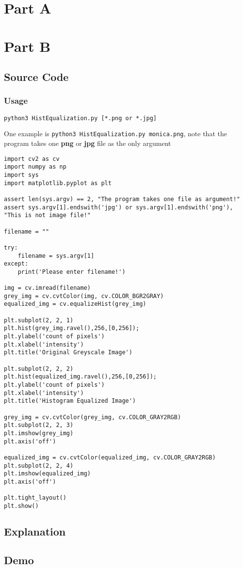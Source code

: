 \documentclass[12pt]{article}
\title{\mytitle}
\author{\myauthor}
\date{}
\begin{document}
\onehalfspacing
\maketitle

\section{Part A}

\newpage
\section{Part B}
\subsection{Source Code}
\subsubsection{Usage}
\begin{Verbatim}[linenos]
python3 HistEqualization.py [*.png or *.jpg]
\end{Verbatim}

One example is \texttt{python3 HistEqualization.py monica.png}, note that the program takes one \textbf{png} or \textbf{jpg} file as the only argument
\begin{verbatim}
import cv2 as cv
import numpy as np
import sys
import matplotlib.pyplot as plt

assert len(sys.argv) == 2, "The program takes one file as argument!"
assert sys.argv[1].endswith('jpg') or sys.argv[1].endswith('png'), "This is not image file!"

filename = ""

try:
    filename = sys.argv[1]
except:
    print('Please enter filename!')

img = cv.imread(filename)
grey_img = cv.cvtColor(img, cv.COLOR_BGR2GRAY)
equalized_img = cv.equalizeHist(grey_img)

plt.subplot(2, 2, 1)
plt.hist(grey_img.ravel(),256,[0,256]);
plt.ylabel('count of pixels')
plt.xlabel('intensity')
plt.title('Original Greyscale Image')

plt.subplot(2, 2, 2)
plt.hist(equalized_img.ravel(),256,[0,256]);
plt.ylabel('count of pixels')
plt.xlabel('intensity')
plt.title('Histogram Equalized Image')

grey_img = cv.cvtColor(grey_img, cv.COLOR_GRAY2RGB)
plt.subplot(2, 2, 3)
plt.imshow(grey_img)
plt.axis('off')

equalized_img = cv.cvtColor(equalized_img, cv.COLOR_GRAY2RGB)
plt.subplot(2, 2, 4)
plt.imshow(equalized_img)
plt.axis('off')

plt.tight_layout()
plt.show()
\end{verbatim}
\subsection{Explanation}
\subsection{Demo}
\end{document}
